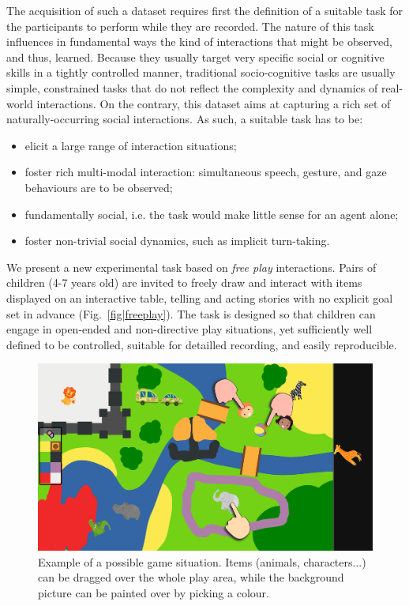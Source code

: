 \documentclass{article}
\newcommand{\ie}{i.e.\xspace}
\begin{document}
The acquisition of such a dataset requires first the definition of a suitable
task for the participants to perform while they are recorded. The nature of
this task influences in fundamental ways the kind of interactions that might be
observed, and thus, learned. Because they usually target very specific social
or cognitive skills in a tightly controlled manner, traditional socio-cognitive tasks are
usually simple, constrained tasks that do not reflect the complexity and dynamics of
real-world interactions. On the contrary, this dataset aims at capturing a rich set
of naturally-occurring social interactions. As such, a suitable task has to be:

\begin{itemize}
    \item elicit a large range of interaction situations;
    \item foster rich multi-modal interaction: simultaneous speech, gesture, and gaze
        behaviours are to be observed;
    \item fundamentally social, \ie the task would make little sense for an
        agent alone;
    \item foster non-trivial social dynamics, such as implicit turn-taking.
\end{itemize}

We present a new experimental task based on \emph{free play} interactions. Pairs
of children (4-7 years old) are invited to freely draw and interact with items
displayed on an interactive table, telling and acting stories with no explicit
goal set in advance (Fig.~\ref{fig|freeplay}). The task is designed so that
children can engage in open-ended and non-directive play situations, yet
sufficiently well defined to be controlled, suitable for detailled recording,
and easily reproducible.

\begin{figure}[ht!]
    \centering
    \includegraphics[width=0.8\linewidth]{sandbox}
    \caption{Example of a possible game situation. Items (animals,
    characters...) can be dragged over the whole play area, while the background
    picture can be painted over by picking a colour.}

    \label{fig|sandbox}
\end{figure}
\end{document}
